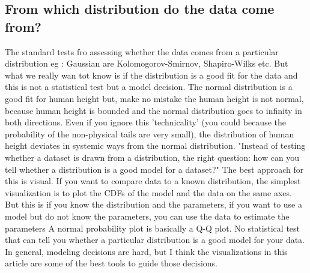 \documentclass[11pt]{article}
\theoremstyle{definition}
\theoremstyle{remark}
\begin{document}
\subsection{From which distribution do the data come from?}
\label{sse:leaversremainers}
The standard tests fro assessing whether the data comes from a particular distribution eg : Gaussian are Kolomogorov-Smirnov, Shapiro-Wilks etc. But what we really wan tot know is if the distribution is a good fit for the data and this is not a statistical test but a model decision.
The normal distribution is a good fit for human height but, make no mistake the human height is not normal, because human height is bounded and the normal distribution goes to infinity in both directions.
Even if you ignore this 'technicality' (you could because the probability of the non-physical tails are very small), the distribution of human height deviates in systemic ways from the normal distribution.
"Instead of testing whether a dataset is drawn from a distribution, the right question: how can you tell whether a distribution is a good model for a dataset?" The best approach for this is visual.
If you want to compare data to a known distribution, the simplest visualization is to plot the CDFs of the model and the data on the same axes. But this is if you know the distribution and the parameters, if you want to use a model but do not know the parameters, you can use the data to estimate the parameters
A normal probability plot is basically a Q-Q plot. No statistical test that can tell you whether a particular distribution is a good model for your data.  In general, modeling decisions are hard, but I think the visualizations in this article are some of the best tools to guide those decisions.
\end{document}

